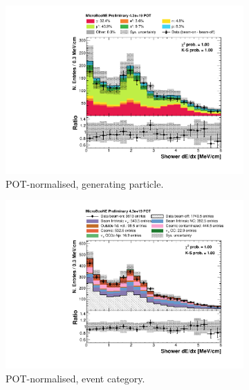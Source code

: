 \begin{figure}[htbp]
\centering
  \begin{subfigure}{0.49\textwidth}
    \includegraphics[width=\linewidth]{figures/h_shower_dedx_cali_pdg.pdf}
    \caption{POT-normalised, generating particle.} \label{fig:dedx_pdg}
  \end{subfigure}
  \begin{subfigure}{0.49\textwidth}
    \includegraphics[width=\linewidth]{figures/h_shower_dedx_cali.pdf}
    \caption{POT-normalised, event category.} \label{fig:dedx_pot}
  \end{subfigure}
  \begin{subfigure}{0.49\textwidth}

\end{subfigure}
\end{figure}
